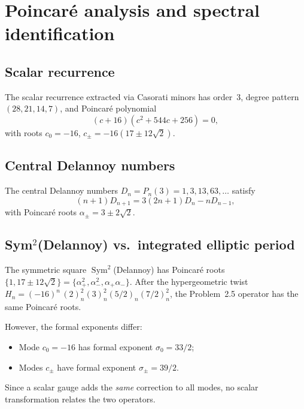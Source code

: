 \documentclass[11pt]{article}
\begin{document}
\section{Poincar\'e analysis and spectral identification}

\subsection{Scalar recurrence}

The scalar recurrence extracted via Casorati minors has
order~3, degree pattern $(28,21,14,7)$, and Poincar\'e polynomial
\begin{equation}\label{eq:poincare}
(c+16)(c^2 + 544c + 256) = 0,
\end{equation}
with roots
$c_0 = -16$, $c_\pm = -16(17 \pm 12\sqrt{2})$.

\subsection{Central Delannoy numbers}

The central Delannoy numbers $D_n = P_n(3) = 1, 3, 13, 63, \ldots$
satisfy
\begin{equation}\label{eq:delannoy}
(n+1)D_{n+1} = 3(2n+1)D_n - nD_{n-1},
\end{equation}
with Poincar\'e roots $\alpha_\pm = 3 \pm 2\sqrt{2}$.

\subsection{Sym${}^2$(Delannoy) vs.\ integrated elliptic period}

The symmetric square $\operatorname{Sym}^2$(Delannoy) has
Poincar\'e roots $\{1, 17 \pm 12\sqrt{2}\} = \{\alpha_+^2,
\alpha_-^2, \alpha_+\alpha_-\}$.
After the hypergeometric twist
$H_n = (-16)^n\,(2)_n^2(3)_n^2(5/2)_n(7/2)_n^2$,
the Problem~2.5 operator has the same Poincar\'e roots.

However, the formal exponents differ:
\begin{itemize}
\item Mode $c_0 = -16$ has formal exponent $\sigma_0 = 33/2$;
\item Modes $c_\pm$ have formal exponent $\sigma_\pm = 39/2$.
\end{itemize}
Since a scalar gauge adds the \emph{same} correction to all
modes, no scalar transformation relates the two operators.
\end{document}

